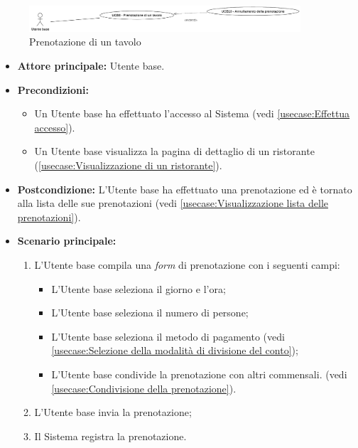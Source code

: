 \label{usecase:Prenotazione di un tavolo}

\begin{figure}[h]
	\centering
	\includegraphics[width=0.9\textwidth]{./uml/UCB8-10.png} 
	\caption{Prenotazione di un tavolo}
	\label{fig:UCB8-10}
  \end{figure}

\begin{itemize}
	\item \textbf{Attore principale:} Utente base.
	\item \textbf{Precondizioni:}
	      \begin{itemize}
		      \item Un Utente base ha effettuato l'accesso al Sistema (vedi \autoref{usecase:Effettua accesso}).
		      \item Un Utente base visualizza la pagina di dettaglio di un ristorante (\autoref{usecase:Visualizzazione di un ristorante}).
	      \end{itemize}
	\item \textbf{Postcondizione:} L'Utente base ha effettuato una prenotazione ed è tornato alla lista delle sue prenotazioni (vedi \autoref{usecase:Visualizzazione lista delle prenotazioni}).


	\item \textbf{Scenario principale:}
	      \begin{enumerate}
		      \item L'Utente base compila una \textit{form} di prenotazione con i seguenti campi:
			 \begin{itemize}
				\item L'Utente base seleziona il giorno e l'ora;
		      	\item L'Utente base seleziona il numero di persone;
		      	\item L'Utente base seleziona il metodo di pagamento (vedi \autoref{usecase:Selezione della modalità di divisione del conto});
		      	\item L'Utente base condivide la prenotazione con altri commensali. (vedi \autoref{usecase:Condivisione della prenotazione}).
			 \end{itemize}
		      \item L'Utente base invia la prenotazione;
		      \item Il Sistema registra la prenotazione.


\end{enumerate}
\end{itemize}
